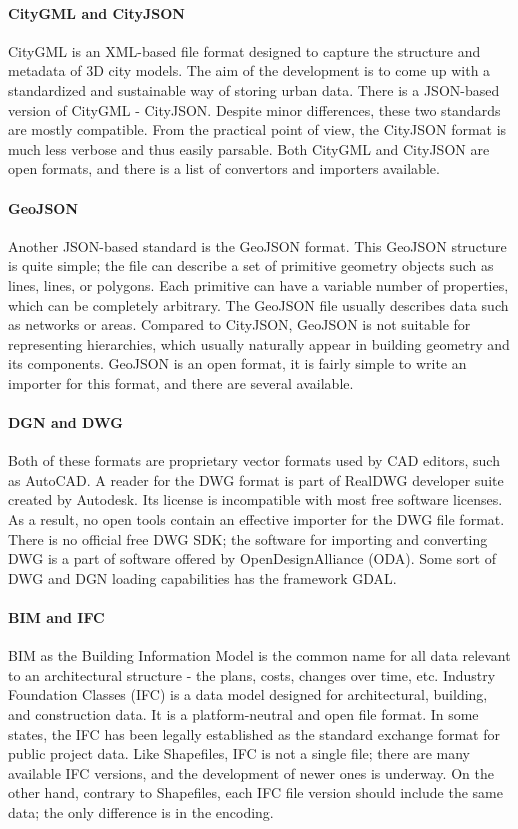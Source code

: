 \paragraph{CityGML and CityJSON}
CityGML is an XML-based file format designed to capture the structure and metadata of 3D city models. The aim of the development is to come up with a standardized and sustainable way of storing urban data. There is a JSON-based version of CityGML - CityJSON. Despite minor differences, these two standards are mostly compatible. From the practical point of view, the CityJSON format is much less verbose and thus easily parsable. Both CityGML and CityJSON are open formats, and there is a list of convertors and importers available.

\paragraph{GeoJSON}
Another JSON-based standard is the GeoJSON format. This GeoJSON structure is quite simple; the file can describe a set of primitive geometry objects such as lines, lines, or polygons. Each primitive can have a variable number of properties, which can be completely arbitrary. The GeoJSON file usually describes data such as networks or areas. Compared to CityJSON, GeoJSON is not suitable for representing hierarchies, which usually naturally appear in building geometry and its components. GeoJSON is an open format, it is fairly simple to write an importer for this format, and there are several available. 

\paragraph{DGN and DWG}
Both of these formats are proprietary vector formats used by CAD editors, such as AutoCAD. A reader for the DWG format is part of RealDWG developer suite created by Autodesk. Its license is incompatible with most free software licenses. As a result, no open tools contain an effective importer for the DWG file format. There is no official free DWG SDK; the software for importing and converting DWG is a part of software offered by OpenDesignAlliance (ODA). Some sort of DWG and DGN loading capabilities has the framework GDAL.

\paragraph{BIM and IFC}
BIM as the Building Information Model is the common name for all data relevant to an architectural structure - the plans, costs, changes over time, etc.  Industry Foundation Classes (IFC) is a data model designed for architectural, building, and construction data. It is a platform-neutral and open file format. In some states, the IFC has been legally established as the standard exchange format for public project data. Like Shapefiles, IFC is not a single file; there are many available IFC versions, and the development of newer ones is underway. On the other hand, contrary to Shapefiles, each IFC file version should include the same data; the only difference is in the encoding.
